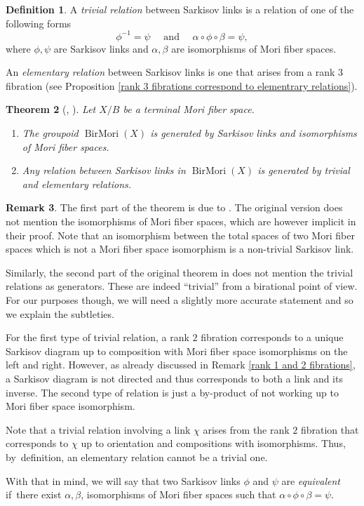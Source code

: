 \documentclass[JEP,XML,SOM,Unicode,published]{cedram}
\theoremstyle{plain}
\newtheorem{theorem}{Theorem}[section]
\theoremstyle{definition}
\newtheorem{remark}[theorem]{Remark}
\newtheorem{definition}[theorem]{Definition}
\newcommand\BirMori{\operatorname{BirMori}}
\begin{document}
\begin{definition}
A \emph{trivial relation} between Sarkisov links is a relation of one of the following forms
\[
\phi^{-1} = \psi \quad \text{ and } \quad \alpha \circ \phi \circ \beta = \psi,
\]
where $\phi, \psi$ are Sarkisov links and $\alpha, \beta$ are isomorphisms of Mori fiber spaces.

An \emph{elementary relation} between Sarkisov links is one that arises from a rank $3$ fibration (see Proposition \ref{rank 3 fibrations correspond to elementrary relations}).
\end{definition}

\begin{theorem}[{\cite[Th.\,1.1]{HM13}, \cite[Th.\,4.28]{BLZ}}]\label{elementary relations are generators}
Let $X/B$ be a terminal Mori fiber space.
\begin{enumerate}
\item The groupoid $\BirMori(X)$ is generated by Sarkisov links and isomorphisms of Mori fiber spaces.
\item Any relation between Sarkisov links in $\BirMori(X)$ is generated by trivial and elementary relations.
\end{enumerate}
\end{theorem}

\begin{remark}\label{equivalent links}
The first part of the theorem is due to \cite{HM13}. The original version does not mention the isomorphisms of Mori fiber spaces, which are however implicit in their proof.
Note that an isomorphism between the total spaces of two Mori fiber spaces which is not a Mori fiber space isomorphism is a non-trivial Sarkisov link.

Similarly, the second part of the original theorem in \cite{BLZ} does not mention the trivial relations as generators. These are indeed ``trivial'' from a birational point of view. For our purposes though, we will need a slightly more accurate statement and so we explain the subtleties.

For the first type of trivial relation, a rank $2$ fibration corresponds to a unique Sarkisov diagram up to composition with Mori fiber space isomorphisms on the left and right. However, as already discussed in Remark \ref{rank 1 and 2 fibrations}, a Sarkisov diagram is not directed and thus corresponds to both a link and its inverse.
The second type of relation is just a by-product of not working up to Mori fiber space isomorphism.

Note that a trivial relation involving a link $\chi$ arises from the rank $2$ fibration that corresponds to $\chi$ up to orientation and compositions with isomorphisms.
Thus, by~definition, an elementary relation cannot be a trivial one.

With that in mind, we will say that two Sarkisov links $\phi$ and $\psi$ are \emph{equivalent} if~there exist $\alpha, \beta$, isomorphisms of Mori fiber spaces such that $\alpha \circ \phi \circ \beta = \psi$.
\end{remark}
\end{document}
